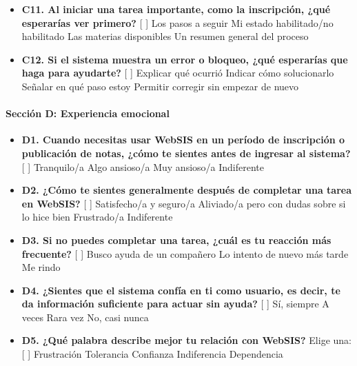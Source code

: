 \begin{itemize}
  \item \textbf{C11. Al iniciar una tarea importante, como la inscripción, ¿qué esperarías ver primero?} [ ] Los pasos a seguir \quad [ ] Mi estado habilitado/no habilitado \quad [ ] Las materias disponibles \quad [ ] Un resumen general del proceso
  \item \textbf{C12. Si el sistema muestra un error o bloqueo, ¿qué esperarías que haga para ayudarte?} [ ] Explicar qué ocurrió \quad [ ] Indicar cómo solucionarlo \quad [ ] Señalar en qué paso estoy \quad [ ] Permitir corregir sin empezar de nuevo
\end{itemize}

\paragraph{Sección D: Experiencia emocional}

\begin{itemize}
  \item \textbf{D1. Cuando necesitas usar WebSIS en un período de inscripción o publicación de notas, ¿cómo te sientes antes de ingresar al sistema?} [ ] Tranquilo/a \quad [ ] Algo ansioso/a \quad [ ] Muy ansioso/a \quad [ ] Indiferente
  \item \textbf{D2. ¿Cómo te sientes generalmente después de completar una tarea en WebSIS?} [ ] Satisfecho/a y seguro/a \quad [ ] Aliviado/a pero con dudas sobre si lo hice bien \quad [ ] Frustrado/a \quad [ ] Indiferente
  \item \textbf{D3. Si no puedes completar una tarea, ¿cuál es tu reacción más frecuente?} [ ] Busco ayuda de un compañero \quad [ ] Lo intento de nuevo más tarde \quad [ ] Me rindo
  \item \textbf{D4. ¿Sientes que el sistema confía en ti como usuario, es decir, te da información suficiente para actuar sin ayuda?} [ ] Sí, siempre \quad [ ] A veces \quad [ ] Rara vez \quad [ ] No, casi nunca
  \item \textbf{D5. ¿Qué palabra describe mejor tu relación con WebSIS?} Elige una: [ ] Frustración \quad [ ] Tolerancia \quad [ ] Confianza \quad [ ] Indiferencia \quad [ ] Dependencia
\end{itemize}
